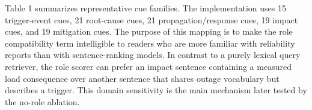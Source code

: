 \documentclass{ieeeaccess}
\begin{document}
\begin{table}[ht]
\centering
\caption{Comparison of Causal role across NERC-style evidence cues used for interpretation}
\label{tab:1}
\end{table}

Table 1 summarizes representative cue families. The implementation uses 15 trigger-event cues, 21 root-cause cues, 21 propagation/response cues, 19 impact cues, and 19 mitigation cues. The purpose of this mapping is to make the role compatibility term intelligible to readers who are more familiar with reliability reports than with sentence-ranking models. In contrast to a purely lexical query retriever, the role scorer can prefer an impact sentence containing a measured load consequence over another sentence that shares outage vocabulary but describes a trigger. This domain sensitivity is the main mechanism later tested by the no-role ablation.
\end{document}
